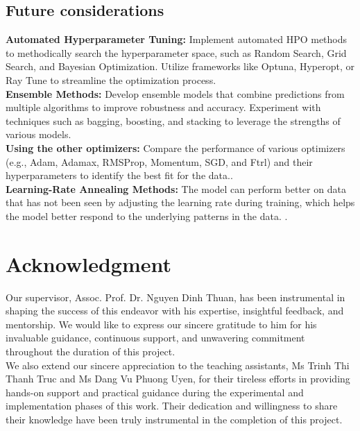 \documentclass{ieeeojies}
\begin{document}
\subsection{Future considerations}
\textbf {Automated Hyperparameter Tuning:}
Implement automated HPO methods to methodically search the hyperparameter space, such as Random Search, Grid Search, and Bayesian Optimization.
Utilize frameworks like Optuna, Hyperopt, or Ray Tune to streamline the optimization process.\\
\textbf {Ensemble Methods:}
Develop ensemble models that combine predictions from multiple algorithms to improve robustness and accuracy.
Experiment with techniques such as bagging, boosting, and stacking to leverage the strengths of various models.\\
\textbf {Using the other optimizers:}
Compare the performance of various optimizers (e.g., Adam, Adamax, RMSProp, Momentum, SGD, and Ftrl) and their hyperparameters to identify the best fit for the data..\\
\textbf {Learning-Rate Annealing Methods:}
The model can perform better on data that has not been seen by adjusting the learning rate during training, which helps the model better respond to the underlying patterns in the data. \cite{future_cons}.

\section*{Acknowledgment}
Our supervisor, Assoc. Prof. Dr. Nguyen Dinh Thuan, has been instrumental in shaping the success of this endeavor with his expertise, insightful feedback, and mentorship. We would like to express our sincere gratitude to him for his invaluable guidance, continuous support, and unwavering commitment throughout the duration of this project.\\
We also extend our sincere appreciation to the teaching assistants, Ms Trinh Thi Thanh Truc and Ms Dang Vu Phuong Uyen, for their tireless efforts in providing hands-on support and practical guidance during the experimental and implementation phases of this work. Their dedication and willingness to share their knowledge have been truly instrumental in the completion of this project.\\



\EOD
\end{document}
